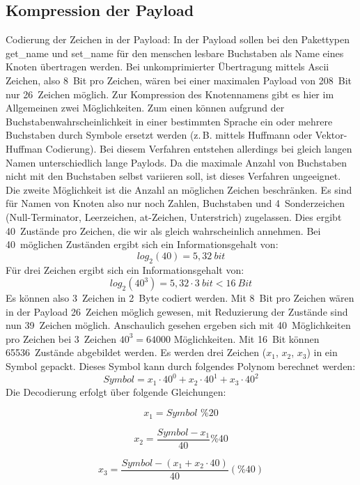 \documentclass{IEEEtran}
\begin{document}
    \subsection{Kompression der Payload}
    Codierung der Zeichen in der Payload: 
    In der Payload sollen bei den Pakettypen get\_name und set\_name für den 
    menschen lesbare Buchstaben als Name eines Knoten übertragen werden. Bei 
    unkomprimierter Übertragung mittels Ascii Zeichen, also 8~Bit pro Zeichen, 
    wären bei einer maximalen Payload von 208~Bit nur 26~Zeichen möglich. Zur 
    Kompression des Knotennamens gibt es hier im Allgemeinen zwei Möglichkeiten. 
    Zum einen können aufgrund der Buchstabenwahrscheinlichkeit in einer 
    bestimmten Sprache ein oder mehrere Buchstaben durch Symbole ersetzt werden 
    (z.\,B. mittels Huffmann oder Vektor-Huffman Codierung). Bei diesem Verfahren 
    entstehen allerdings bei gleich langen Namen unterschiedlich lange Paylods. 
    Da die maximale Anzahl von Buchstaben nicht mit den Buchstaben selbst 
    variieren soll, ist dieses Verfahren ungeeignet. Die zweite Möglichkeit ist 
    die Anzahl an möglichen Zeichen beschränken. Es sind für Namen von Knoten 
    also nur noch Zahlen, Buchstaben und 4~Sonderzeichen (Null-Terminator, 
    Leerzeichen, at-Zeichen, Unterstrich) zugelassen. Dies ergibt 40~Zustände 
    pro Zeichen, die wir als gleich wahrscheinlich annehmen. Bei 40~möglichen 
    Zuständen ergibt sich ein Informationsgehalt von: $$log_{2}(40) = 5,32~bit$$
    Für drei Zeichen ergibt sich ein Informationsgehalt von:
    $$log_{2}(40^3) = 5,32 \cdot 3~bit < 16~Bit$$ Es können also 3~Zeichen 
    in 2~Byte codiert werden. Mit 8~Bit pro Zeichen wären in der Payload 
    26~Zeichen möglich gewesen, mit Reduzierung der Zustände sind nun 39~Zeichen 
    möglich.
    Anschaulich gesehen ergeben sich mit 40~Möglichkeiten pro Zeichen bei 
    3~Zeichen $40^3 = 64000$ Möglichkeiten. Mit 16~Bit können 65536~Zustände 
    abgebildet werden. 
    Es werden drei Zeichen ($x_{1}$, $x_{2}$, $x_{3}$) in ein Symbol gepackt. 
    Dieses Symbol kann durch folgendes Polynom berechnet werden:
    $$Symbol = x_{1} \cdot 40^{0} + x_{2} \cdot 40^{1} + x_{3} \cdot 40^{2}$$
    Die Decodierung erfolgt über folgende Gleichungen:

    $$x_{1}=Symbol \,\, \% 20$$

    $$x_{2} = \frac{Symbol - x_{1}}{40} \% 40$$
    
    $$x_{3} = \frac{Symbol - (x_{1} + x_{2} \cdot 40)}{40} (\% 40)$$
\end{document}
